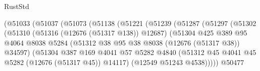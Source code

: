 \begin{lexlean}{RustStd}
\begin{coremodule}
                                    (@51033
                                      (@51037
                                        (@51073
                                          (@51138
                                            (@51221
                                              (@51239
                                                (@51287
                                                  (@51297
                                                    (@51302
                                                      (@51310
                                                        (@51316 (@12676 (@51317 @138)) @12687)
                                                        (@51304
                                                          @425
                                                          @389
                                                          @95
                                                          @4064
                                                          @8038
                                                          @5284
                                                          (@51312
                                                            @38
                                                            @95
                                                            @38
                                                            @8038
                                                            (@12676 (@51317 @38))
                                                            @34597)
                                                          (@51304
                                                            @387
                                                            @169
                                                            @4041
                                                            @57
                                                            @5282
                                                            @4840
                                                            (@51312
                                                              @45
                                                              @4041
                                                              @45
                                                              @5282
                                                              (@12676 (@51317 @45))
                                                              @14117)
                                                            (@12549 @51243 @4538)))))
                                                    @50477

\end{coremodule}
\end{lexlean}
